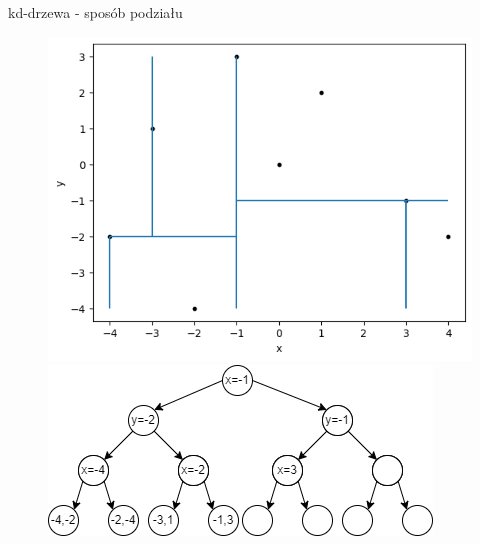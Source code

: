 \documentclass[aspectratio=169,dvipsnames]{beamer}
\begin{document}
\begin{frame}{kd-drzewa - sposób podziału}
    \begin{figure}[H]
        \centering
          \begin{minipage}{0.5\textwidth}
            \centering
            \includegraphics[width=\linewidth]{images/plots/7.png}
          \end{minipage}%
          \begin{minipage}{0.5\textwidth}
            \centering
            \includegraphics[width=\linewidth]{images/trees/9.drawio.png}
          \end{minipage}
    \end{figure}
\end{frame}
\end{document}
